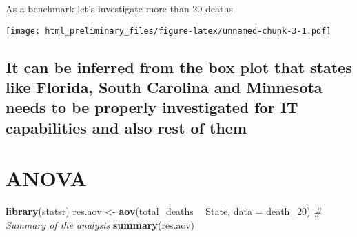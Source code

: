 \documentclass[
]{article}
\newenvironment{Shaded}{\begin{snugshade}}{\end{snugshade}}
\newcommand{\CommentTok}[1]{\textcolor[rgb]{0.56,0.35,0.01}{\textit{#1}}}
\newcommand{\DataTypeTok}[1]{\textcolor[rgb]{0.13,0.29,0.53}{#1}}
\newcommand{\DecValTok}[1]{\textcolor[rgb]{0.00,0.00,0.81}{#1}}
\newcommand{\KeywordTok}[1]{\textcolor[rgb]{0.13,0.29,0.53}{\textbf{#1}}}
\newcommand{\NormalTok}[1]{#1}
\newcommand{\OperatorTok}[1]{\textcolor[rgb]{0.81,0.36,0.00}{\textbf{#1}}}
\newcommand{\StringTok}[1]{\textcolor[rgb]{0.31,0.60,0.02}{#1}}
\begin{document}
As a benchmark let's investigate more than 20 deaths

\begin{Shaded}
\end{Shaded}

\texttt{[image: html\_preliminary\_files/figure-latex/unnamed-chunk-3-1.pdf]}

\hypertarget{it-can-be-inferred-from-the-box-plot-that-states-like-florida-south-carolina-and-minnesota-needs-to-be-properly-investigated-for-it-capabilities-and-also-rest-of-them}{%
\subsection{It can be inferred from the box plot that states like
Florida, South Carolina and Minnesota needs to be properly investigated
for IT capabilities and also rest of
them}\label{it-can-be-inferred-from-the-box-plot-that-states-like-florida-south-carolina-and-minnesota-needs-to-be-properly-investigated-for-it-capabilities-and-also-rest-of-them}}

\hypertarget{anova}{%
\section{ANOVA}\label{anova}}

\begin{Shaded}
\begin{Highlighting}[]
\KeywordTok{library}\NormalTok{(statsr)}
\NormalTok{res.aov <-}\StringTok{ }\KeywordTok{aov}\NormalTok{(total_deaths }\OperatorTok{~}\StringTok{ }\NormalTok{State, }\DataTypeTok{data =}\NormalTok{ death_}\DecValTok{20}\NormalTok{)}
\CommentTok{# Summary of the analysis}
\KeywordTok{summary}\NormalTok{(res.aov)}
\end{Highlighting}
\end{Shaded}
\end{document}
